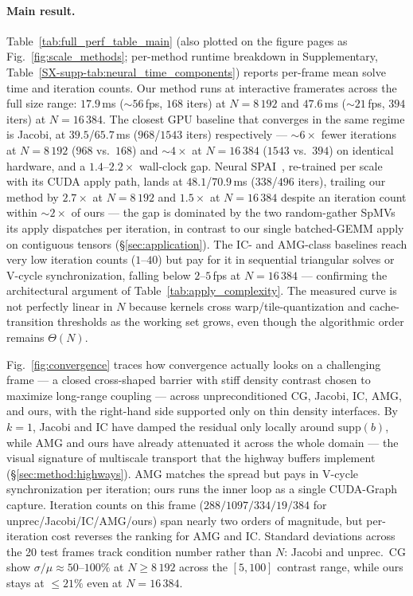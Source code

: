 \documentclass[acmtog]{acmart}
\theoremstyle{plain}
\begin{document}
\paragraph{Main result.}
Table~\ref{tab:full_perf_table_main} (also plotted on the figure pages as
Fig.~\ref{fig:scale_methods}; per-method runtime breakdown in Supplementary,
Table~\ref{SX-supp-tab:neural_time_components}) reports per-frame mean solve time and
iteration counts. Our method runs at interactive framerates across the full size range:
$17.9$\,ms ($\sim\!56$\,fps, $168$ iters) at $N\!=\!8\,192$ and $47.6$\,ms
($\sim\!21$\,fps, $394$ iters) at $N\!=\!16\,384$. The closest GPU baseline that
converges in the same regime is Jacobi, at $39.5$/$65.7$\,ms ($968$/$1543$ iters)
respectively --- $\sim\!6\times$ fewer iterations at $N\!=\!8\,192$ ($968$ vs.\ $168$) and
$\sim\!4\times$ at $N\!=\!16\,384$ ($1543$ vs.\ $394$) on identical hardware, and a
$1.4$--$2.2\!\times$ wall-clock gap. Neural
SPAI~\cite{Yang2025sparse}, re-trained per scale with its CUDA apply path, lands at
$48.1$/$70.9$\,ms ($338$/$496$ iters), trailing our method by $2.7\times$ at
$N\!=\!8\,192$ and $1.5\times$ at $N\!=\!16\,384$ despite an iteration count within
$\sim\!2\times$ of ours --- the gap is dominated by the two random-gather SpMVs its
apply dispatches per iteration, in contrast to our single batched-GEMM apply on
contiguous tensors (\S\ref{sec:application}). The IC- and AMG-class baselines reach
very low iteration counts ($1$--$40$) but pay for it in sequential triangular solves
or V-cycle synchronization, falling below $2$--$5$\,fps at $N\!=\!16\,384$ ---
confirming the architectural argument of Table~\ref{tab:apply_complexity}. The measured
curve is not perfectly linear in $N$ because kernels cross warp/tile-quantization and
cache-transition thresholds as the working set grows, even though the algorithmic order
remains $\Theta(N)$.

Fig.~\ref{fig:convergence} traces how convergence actually looks on a challenging frame
--- a closed cross-shaped barrier with stiff density contrast chosen to maximize
long-range coupling --- across unpreconditioned CG, Jacobi, IC, AMG, and ours, with the
right-hand side supported only on thin density interfaces. By $k\!=\!1$, Jacobi and IC
have damped the residual only locally around $\mathrm{supp}(b)$, while AMG and ours have
already attenuated it across the whole domain --- the visual signature of multiscale
transport that the highway buffers implement (\S\ref{sec:method:highways}). AMG matches
the spread but pays in V-cycle synchronization per iteration; ours runs the inner loop
as a single CUDA-Graph capture. Iteration counts on this frame
($288/1097/334/19/384$ for unprec/Jacobi/IC/AMG/ours) span nearly two orders of
magnitude, but per-iteration cost reverses the ranking for AMG and IC. Standard
deviations across the 20 test frames track condition number rather than $N$: Jacobi and
unprec.\ CG show $\sigma/\mu\!\approx\!50$--$100\%$ at $N\!\ge\!8\,192$ across the
$[5,100]$ contrast range, while ours stays at $\le\!21\%$ even at $N\!=\!16\,384$.
\end{document}
